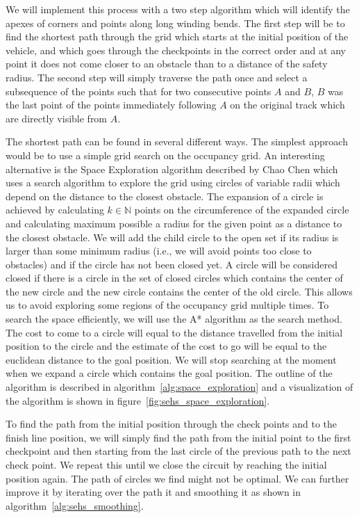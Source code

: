 
We will implement this process with a two step algorithm which will identify the apexes of corners and points along long winding bends. The first step will be to find the shortest path through the grid which starts at the initial position of the vehicle, and which goes through the checkpoints in the correct order and at any point it does not come closer to an obstacle than to a distance of the safety radius. The second step will simply traverse the path once and select a subsequence of the points such that for two consecutive points $A$ and $B$, $B$ was the last point of the points immediately following $A$ on the original track which are directly visible from $A$.

The shortest path can be found in several different ways. The simplest approach would be to use a simple grid search on the occupancy grid. An interesting alternative is the Space Exploration algorithm described by Chao Chen \cite{SEHS} which uses a search algorithm to explore the grid using circles of variable radii which depend on the distance to the closest obstacle. The expansion of a circle is achieved by calculating $k\in\mathbb{N}$ points on the circumference of the expanded circle and calculating maximum possible a radius for the given point as a distance to the closest obstacle. We will add the child circle to the open set if its radius is larger than some minimum radius (i.e., we will avoid points too close to obstacles) and if the circle has not been closed yet. A circle will be considered closed if there is a circle in the set of closed circles which contains the center of the new circle and the new circle contains the center of the old circle. This allows us to avoid exploring some regions of the occupancy grid multiple times. To search the space efficiently, we will use the A* algorithm as the search method. The cost to come to a circle will equal to the distance travelled from the initial position to the circle and the estimate of the cost to go will be equal to the euclidean distance to the goal position. We will stop searching at the moment when we expand a circle which contains the goal position. The outline of the algorithm is described in algorithm~\ref{alg:space_exploration} and a visualization of the algorithm is shown in figure~\ref{fig:sehs_space_exploration}.

To find the path from the initial position through the check points and to the finish line position, we will simply find the path from the initial point to the first checkpoint and then starting from the last circle of the previous path to the next check point. We repeat this until we close the circuit by reaching the initial position again. The path of circles we find might not be optimal. We can further improve it by iterating over the path it and smoothing it as shown in algorithm~\ref{alg:sehs_smoothing}.

